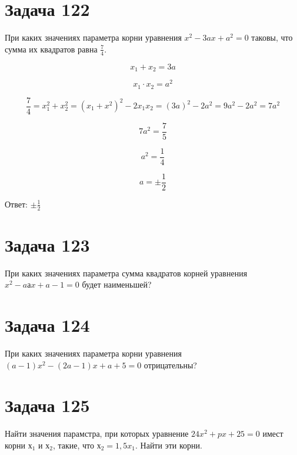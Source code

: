 \documentclass[a4paper,12pt]{article}
\begin{document}
\section{Задача 122}

При каких значениях параметра корни уравнения $x^2 - 3ax + a^2 = 0$ таковы,
что сумма их квадратов равна $\frac{7}{4}$.

\begin{equation}
    x_1 + x_2 = 3a
\end{equation}

\begin{equation}
    x_1 \cdot x_2 = a^2
\end{equation}

\begin{equation}
    \frac{7}{4} =
    x_1^2 + x_2^2 =
    (x_1 + x^2)^2 - 2x_1x_2 =
    (3a)^2 - 2a^2 =
    9a^2 - 2a^2 =
    7a^2
\end{equation}

\begin{equation}
    7a^2 = \frac{7}{5}
\end{equation}

\begin{equation}
    a^2 = \frac{1}{4}
\end{equation}

\begin{equation}
    a = \pm \frac{1}{2}
\end{equation}

Ответ: $\pm\frac{1}{2}$

\section{Задача 123}

При каких значениях параметра сумма квадратов корней
уравнения $x^2 - aаx + a - 1 = 0$ будет наименьшей?

\section{Задача 124}

При каких значениях параметра корни уравнения
$(a - 1)x^2 - (2a - 1)x + a + 5 = 0$ отрицательны?

\section{Задача 125}

Найти значения парамстра, при которых уравнение
$24x^2 + px + 25 = 0$ имест корни $х_1$ и $х_2$, такие, что $х_2 = 1,5x_1$.
Найти эти корни.
\end{document}

